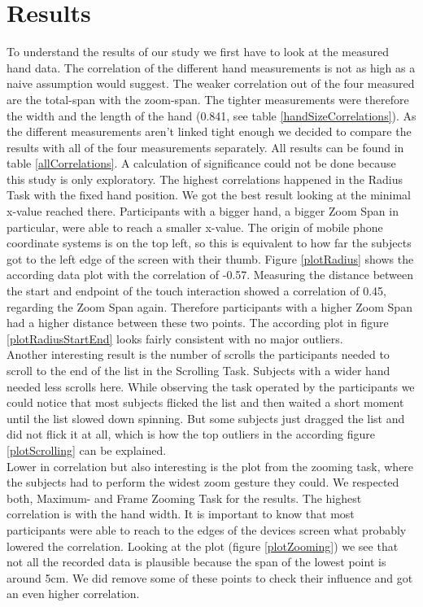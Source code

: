 \documentclass{sigchi}
\begin{document}
\section{Results}
To understand the results of our study we first have to look at the measured hand data. The correlation of the different hand measurements is not as high as a naive assumption would suggest. The weaker correlation out of the four measured are the total-span with the zoom-span. The tighter measurements were therefore the width and the length of the hand (0.841, see table \ref{handSizeCorrelations}). As the different measurements aren't linked tight enough we decided to compare the results with all of the four measurements separately. All results can be found in table \ref{allCorrelations}. A calculation of significance could not be done because this study is only exploratory. The highest correlations happened in the Radius Task with the fixed hand position. We got the best result looking at the minimal x-value reached there. Participants with a bigger hand, a bigger Zoom Span in particular, were able to reach a smaller x-value. The origin of mobile phone coordinate systems is on the top left, so this is equivalent to how far the subjects got to the left edge of the screen with their thumb. Figure \ref{plotRadius} shows the according data plot with the correlation of -0.57. Measuring the distance between the start and endpoint of the touch interaction showed a correlation of 0.45, regarding the Zoom Span again. Therefore participants with a higher Zoom Span had a higher distance between these two points. The according plot in figure \ref{plotRadiusStartEnd} looks fairly consistent with no major outliers.\\
Another interesting result is the number of scrolls the participants needed to scroll to the end of the list in the Scrolling Task. Subjects with a wider hand needed less scrolls here. While observing the task operated by the participants we could notice that most subjects flicked the list and then waited a short moment until the list slowed down spinning. But some subjects just dragged the list and did not flick it at all, which is how the top outliers in the according figure \ref{plotScrolling} can be explained.\\
Lower in correlation but also interesting is the plot from the zooming task, where the subjects had to perform the widest zoom gesture they could. We respected both, Maximum- and Frame Zooming Task for the results. The highest correlation is with the hand width. It is important to know that most participants were able to reach to the edges of the devices screen what probably lowered the correlation. Looking at the plot (figure \ref{plotZooming}) we see that not all the recorded data is plausible because the span of the lowest point is around 5cm. We did remove some of these points to check their influence and got an even higher correlation.\\
\end{document}
